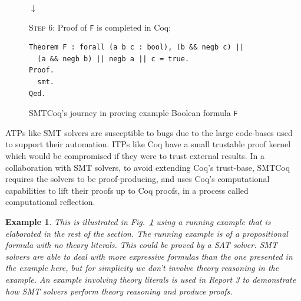 \documentclass{article}
\newtheorem{example}{Example}[section]
\begin{document}
\begin{figure}
		\begin{center}
			$\downarrow$
		\end{center}
		
		\begin{framed}
			\textsc{Step 6}: Proof of \texttt{F} is 
			completed in Coq:
			\begin{verbatim}
Theorem F : forall (a b c : bool), (b && negb c) || 
  (a && negb b) || negb a || c = true.
Proof.
  smt.
Qed.
			\end{verbatim}
		\end{framed}
		\caption{SMTCoq's journey in proving 
			example Boolean formula \texttt{F}}
		\label{fig:smtcoqex}
	\end{figure}
	
	ATPs like SMT solvers are susceptible 
	to bugs due to the large code-bases 
	used to support	their automation. 
	ITPs like Coq have a small trustable 
	proof kernel which would be 
	compromised if they were to trust
	external results. In a collaboration
	with SMT solvers, to avoid extending 
	Coq's trust-base, SMTCoq requires the 
	solvers to be proof-producing, and uses 
	Coq's computational capabilities 
	to lift their proofs up to Coq proofs, 
	in a process called computational 
	reflection. 
	
	\begin{example} 
	\em This is illustrated in 
	Fig.~\ref{fig:smtcoqex} using a 
	running example that is elaborated 
	in the rest of the section. The running
	example is of a propositional formula
	with no theory literals. This could be 
	proved by a SAT solver. SMT solvers 
	are able to deal with more expressive 
	formulas than the one presented in the 
	example here, but for simplicity
	we don't involve theory reasoning
	in the example. An example involving 
	theory literals is used in Report 3 
	to demonstrate how SMT solvers 
	perform theory reasoning and produce
	proofs.
	\end{example}
\end{document}
